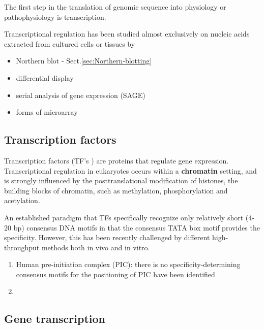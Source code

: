The first step in the translation of genomic sequence  into  physiology  or 
pathophysiology  is  transcription.

Transcriptional  regulation  has  been  studied  almost  exclusively on  nucleic
acids  extracted  from  cultured cells or tissues by
\begin{itemize}
  \item Northern blot - Sect.\ref{sec:Northern-blotting}
  
  \item differential  display
  
  \item serial  analysis  of  gene expression  (SAGE) 
  
  \item  forms  of  microarray

\end{itemize}


\subsection{Transcription factors}
\label{sec:transcription-factor}

Transcription   factors   (TF's ) are proteins that regulate gene expression.
Transcriptional regulation in eukaryotes occurs within a {\bf chromatin}
setting, and is strongly influenced by the posttranslational modification of
histones, the building blocks of chromatin, such as methylation, phosphorylation
and acetylation.

An established paradigm that TFs specifically   recognize   only   relatively
short   (4-20 bp) consensus DNA motifs in that  the consensus TATA box motif
provides the specificity. However, this has been recently challenged by
different  high-throughput methods both in  vivo and in vitro.
\begin{enumerate}

  \item  Human pre-initiation complex (PIC): there is no specificity-determining
    consensus motifs for the positioning of PIC have been identified


  
  \item 
\end{enumerate}

\subsection{Gene transcription}
\label{sec:gene-transription-process}

